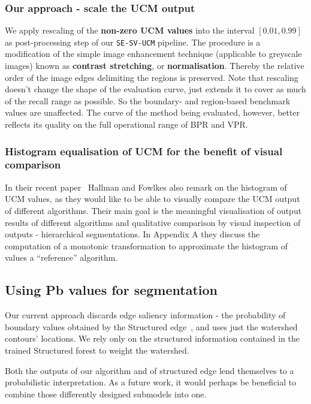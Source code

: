 \subsubsection{Our approach - scale the UCM output} %
We apply rescaling of the {\bf non-zero UCM values} into the interval $[0.01, 0.99]$ as post-processing step of our {\tt SE-SV-UCM} pipeline. The procedure is a modification of the simple image enhancement technique (applicable to greyscale images) known as {\bf contrast stretching}, or {\bf normalisation}. Thereby the relative order of the image edges delimiting the regions is preserved. Note that rescaling doesn't change the shape of the evaluation curve, just extends it to cover as much of the recall range as possible. So the boundary- and region-based benchmark values are unaffected. The curve of the method being evaluated, however, better reflects its quality on the full operational range of BPR and VPR.

\subsubsection{Histogram equalisation of UCM for the benefit of visual comparison}
In their recent paper~\cite{Hallman2014} Hallman and Fowlkes also remark on the histogram of UCM values, as they would like to be able to visually compare the UCM output of different algorithms. Their main goal is the meaningful visualisation of output results of different algorithms and qualitative comparison by visual inspection of outputs - hierarchical segmentations. In Appendix A they discuss the computation of a monotonic transformation to approximate the histogram of values \wrt a ``reference'' algorithm.

\subsection{Using Pb values for segmentation} %
Our current approach discards edge saliency information - the probability of boundary values obtained by the Structured edge~\cite{DollarICCV13edges}, and uses just the watershed contours' locations. We rely only on the structured information contained in the trained Structured forest to weight the watershed.

Both the outputs of our algorithm and of structured edge lend themselves to %
a probabilistic interpretation. As a future work, it would perhaps be beneficial to combine those differently designed submodels into one.
